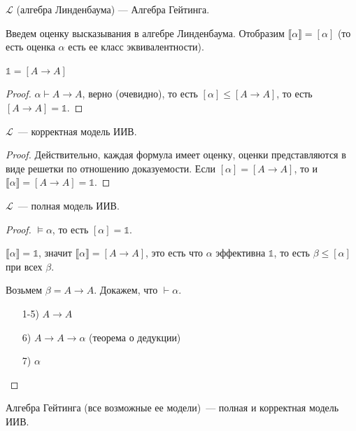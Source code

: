 \begin{theorem}
    $\mathcal{L}$ (алгебра Линденбаума) --- Алгебра Гейтинга.
\end{theorem}

Введем оценку высказывания в алгебре Линденбаума. Отобразим $\llbracket\alpha\rrbracket = [\alpha]$ (то есть оценка $\alpha$ есть ее класс эквивалентности).

\begin{lemma}
    $\mathds{1} = [A \to A]$
\end{lemma}

\begin{proof}
    $\alpha \vdash A \to A$, верно (очевидно), то есть $[\alpha] \leqslant [A \to A]$, то есть $[A \to A] = \mathds{1}$.
\end{proof}

\begin{theorem}
    $\mathcal{L}$~--- корректная модель ИИВ.
\end{theorem}

\begin{proof}
    Действительно, каждая формула имеет оценку, оценки представляются в виде решетки по отношению доказуемости. Если $[\alpha] = [A \to A]$, то и $\llbracket \alpha \rrbracket = [A \to A]= \mathds{1}$.
\end{proof}

\begin{theorem}
    $\mathcal{L}$~--- полная модель ИИВ.

\end{theorem}

\begin{proof}
    $\vDash \alpha$, то есть $[\alpha] = \mathds{1}$.

    $\llbracket\alpha\rrbracket = \mathds{1}$, значит $\llbracket\alpha\rrbracket = [A \to A]$, это есть что $\alpha$ эффективна $\mathds{1}$, то есть $\beta \leqslant [\alpha]$ при всех $\beta$.

    Возьмем $\beta = A \to A$. Докажем, что $\vdash \alpha$.
    \begin{itemize}
        \item[1-5)] $A \to A$
        \item[6)] $A \to A \to \alpha$ (теорема о дедукции)
        \item[7)] $\alpha$
    \end{itemize}
\end{proof}

\begin{theorem}
    Алгебра Гейтинга (все возможные ее модели)~--- полная и корректная модель ИИВ.
\end{theorem}

